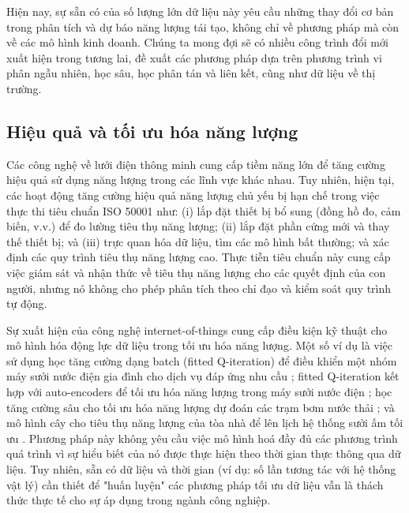 \documentclass[utf8]{frontiersSCNS} %
\begin{document}
Hiện nay, sự sẵn có của số lượng lớn dữ liệu này yêu cầu những thay đổi cơ bản trong phân tích và dự báo năng lượng tái tạo, không chỉ về phương pháp mà còn về các mô hình kinh doanh. Chúng ta mong đợi sẽ có nhiều công trình đổi mới xuất hiện trong tương lai, đề xuất các phương pháp dựa trên phương trình vi phân ngẫu nhiên, học sâu, học phân tán và liên kết, cũng như dữ liệu về thị trường.


\subsection{Hiệu quả và tối ưu hóa năng lượng}
Các công nghệ về lưới điện thông minh cung cấp tiềm năng lớn để tăng cường hiệu quả sử dụng năng lượng trong các lĩnh vực khác nhau. Tuy nhiên, hiện tại, các hoạt động tăng cường hiệu quả năng lượng chủ yếu bị hạn chế trong việc thực thi tiêu chuẩn ISO 50001 như: (i) lắp đặt thiết bị bổ sung (đồng hồ đo, cảm biến, v.v.) để đo lường tiêu thụ năng lượng; (ii) lắp đặt phần cứng mới và thay thế thiết bị; và (iii) trực quan hóa dữ liệu, tìm các mô hình bất thường; và xác định các quy trình tiêu thụ năng lượng cao. Thực tiễn tiêu chuẩn này cung cấp việc giám sát và nhận thức về tiêu thụ năng lượng cho các quyết định của con người, nhưng nó không cho phép phân tích theo chỉ đạo và kiểm soát quy trình tự động.


Sự xuất hiện của công nghệ internet-of-things cung cấp điều kiện kỹ thuật cho mô hình hóa động lực dữ liệu trong tối ưu hóa năng lượng. Một số ví dụ là việc sử dụng học tăng cường dạng batch (fitted Q-iteration) để điều khiển một nhóm máy sưởi nước điện gia đình cho dịch vụ đáp ứng nhu cầu \citep{Ruelens2014}; fitted Q-iteration kết hợp với auto-encoders để tối ưu hóa năng lượng trong máy sưởi nước điện \citep{Ruelens2018}; học tăng cường sâu cho tối ưu hóa năng lượng dự đoán các trạm bơm nước thải \citep{Filipe2019}; và mô hình cây cho tiêu thụ năng lượng của tòa nhà để lên lịch hệ thống sưởi ấm tối ưu \citep{Kouzelis2015}. Phương pháp này không yêu cầu việc mô hình hoá đầy đủ các phương trình quá trình vì sự hiểu biết của nó được thực hiện theo thời gian thực thông qua dữ liệu. Tuy nhiên, sẵn có dữ liệu và thời gian (ví dụ: số lần tương tác với hệ thống vật lý) cần thiết để "huấn luyện" các phương pháp tối ưu dữ liệu vẫn là thách thức thực tế cho sự áp dụng trong ngành công nghiệp.
\end{document}
